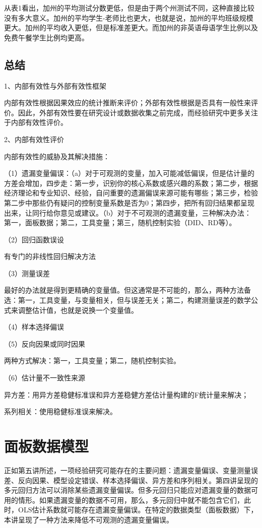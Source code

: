 \documentclass[cn,12pt,math=newtx,citestyle=gb7714-2015,bibstyle=gb7714-2015]{elegantbook}
\begin{document}
从表1看出，加州的平均测试分数更低，但是由于两个州测试不同，这种直接比较没有多大意义。加州的平均学生-老师比也更大，也就是说，加州的平均班级规模更大。加州的平均收入更低，但是标准差更大。而加州的非英语母语学生比例以及免费午餐学生比例均更高。


\section{总结}
1、内部有效性与外部有效性框架

内部有效性根据因果效应的统计推断来评价；外部有效性根据是否具有一般性来评价。因此，外部有效性要在研究设计或数据收集之前完成，而经验研究中更多关注于内部有效性评价。

2、内部有效性评价

内部有效性的威胁及其解决措施：

（1）遗漏变量偏误：（a）对于可观测的变量，加入可能减低偏误，但是估计量的方差会增加，四步走：第一步，识别你的核心系数或感兴趣的系数；第二步，根据经济理论和专业知识、经验，自问重要的遗漏偏误来源可能有哪些；第三步，检验第二步中那些仍有疑问的控制变量系数是否为0；第四步，把所有回归结果都呈现出来，让同行给你意见或建议。（b）对于不可观测的遗漏变量，三种解决办法：第一，面板数据；第二，工具变量；第三，随机控制实验（DID、RD等）。

（2）回归函数误设

有专门的非线性回归解决方法

（3）测量误差

最好的办法就是得到更精确的变量值。但这通常是不可能的，那么，两种方法备选：第一，工具变量，与变量相关，但与误差无关；第二，构建测量误差的数学公式来调整估计值，也就是说换一个变量值。

（4）样本选择偏误

（5）反向因果或同时因果

两种方式解决：第一，工具变量；第二，随机控制实验。

（6）估计量不一致性来源

异方差：用异方差稳健标准误和异方差稳健方差估计量构建的F统计量来解决；

系列相关：使用稳健标准误来解决。

\chapter{面板数据模型}

正如第五讲所述，一项经验研究可能存在的主要问题：遗漏变量偏误、变量测量误差、反向因果、模型设定错误、样本选择偏误、异方差和序列相关。第四讲呈现的多元回归方法可以消除某些遗漏变量偏误。但多元回归只能应对遗漏变量的数据可用的情形。如果遗漏变量的数据不可用，那么，多元回归中就不能包含它们，此时，OLS估计系数就可能存在遗漏变量偏误。在特定的数据类型（面板数据）下，本讲呈现了一种方法来降低不可观测的遗漏变量偏误。
\end{document}
